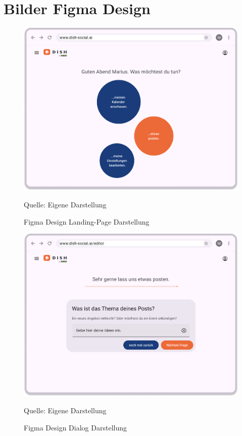 \section{Bilder Figma Design}\label{sec:bilder-figma-design}
\begin{figure}[htbp]
    \centering
    \includegraphics[width=\textwidth]{abbildungen/figma/Landing Page}
    \caption[]{Figma Design Landing-Page Darstellung}
    \label{fig:landing-page}
    \raggedright Quelle: Eigene Darstellung
\end{figure}
\newpage

\begin{figure}[htbp]
    \centering
    \includegraphics[width=\textwidth]{abbildungen/figma/Dialog}
    \caption[]{Figma Design Dialog Darstellung}
    \label{fig:dialog-page}
    \raggedright Quelle: Eigene Darstellung
\end{figure}
\newpage

